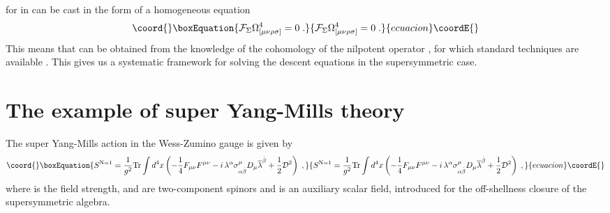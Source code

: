 \documentclass[a4paper,12pt]{article}
\begin{document}
for \coordHE{} in \myHighlight{$\left( \ref{sde}\right) $}\coordHE{} can
be cast in the form of a homogeneous equation 
\begin{equation}\coord{}\boxEquation{
\mathcal{F}_{\Sigma }\Omega _{[\mu \nu \rho \sigma ]}^{4}=0\;.  \label{h-e}
}{
\mathcal{F}_{\Sigma }\Omega _{[\mu \nu \rho \sigma ]}^{4}=0\;.  }{ecuacion}\coordE{}\end{equation}
This means that \coordHE{} can be obtained from
the knowledge of the cohomology of the nilpotent operator \coordHE{}, for which standard techniques are available \cite{pr}. This
gives us a systematic framework for solving the descent equations in the
supersymmetric case.

\section{The example of \coordHE{} super Yang-Mills theory}

The \coordHE{} super Yang-Mills action \coordHE{} in the Wess-Zumino
gauge is given by 
\begin{equation}\coord{}\boxEquation{
S^{\mathrm{N=1}}=\frac{1}{g^{2}}\mathrm{Tr}\int d^{4}x\left( -\frac{1}{4}
F_{\mu \nu }F^{\mu \nu }-i\,\lambda ^{\alpha }\sigma _{\alpha \stackrel{.}{
\beta }}^{\mu }D_{\mu }\overline{\lambda }^{\stackrel{.}{\beta }}+\frac{1}{2}
\mathcal{D}^{2}\right) \;,  \label{n1ac}
}{
S^{\mathrm{N=1}}=\frac{1}{g^{2}}\mathrm{Tr}\int d^{4}x\left( -\frac{1}{4}
F_{\mu \nu }F^{\mu \nu }-i\,\lambda ^{\alpha }\sigma _{\alpha \stackrel{.}{
\beta }}^{\mu }D_{\mu }\overline{\lambda }^{\stackrel{.}{\beta }}+\frac{1}{2}
\mathcal{D}^{2}\right) \;,  }{ecuacion}\coordE{}\end{equation}
where \coordHE{}is the field strength, \myHighlight{$\lambda ^{\alpha }$}\coordHE{} and \coordHE{} are two-component spinors and \coordHE{} is an auxiliary scalar field, introduced for the off-shellness
closure of the supersymmetric algebra.
\end{document}

